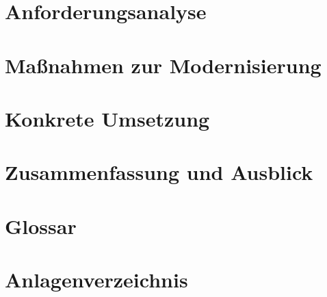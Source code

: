 \documentclass [12pt, a4paper, oneside, titlepage, ngerman]{article}
\begin{document}
\section {Anforderungsanalyse}
\newpage

\section {Maßnahmen zur Modernisierung}
\newpage

\section {Konkrete Umsetzung}
\newpage

\section {Zusammenfassung und Ausblick}
\newpage






\newpage

\setcounter{page}{4}
\section* {Glossar}
\newpage

\section* {Anlagenverzeichnis}
\newpage
\end{document}
